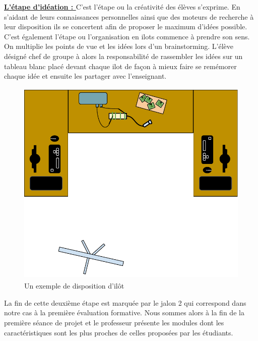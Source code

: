 \documentclass[12pt]{article}
\begin{document}
\vspace{10pt}

\textbf{\underline{L'étape d'idéation : }} C'est l'étape ou la créativité des élèves s'exprime. En s'aidant de leurs connaissances personnelles ainsi que des moteurs de recherche à leur disposition ils se concertent afin de proposer le maximum d'idées possible. C'est également l'étape ou l'organisation en ilots commence à prendre son sens. On multiplie les points de vue et les idées lors d'un brainstorming. L'élève désigné chef de groupe à alors la responsabilité de rassembler les idées sur un tableau blanc placé devant chaque ilot de façon à mieux faire se remémorer chaque idée et ensuite les partager avec l'enseignant.
\newpage
\begin{figure}[!h]
\centering
\includegraphics[width=14cm,height=10cm,trim=0cm 0cm 0cm 0cm, clip=true]{Images_Rapport/ilot}
\caption{Un exemple de disposition d'ilôt}
\end{figure}

\vspace{20pt}

La fin de cette deuxième étape est marquée par le jalon 2 qui correspond dans notre cas à la première évaluation formative. Nous sommes alors à la fin de la première séance de projet et le professeur présente les modules dont les caractéristiques sont les plus proches de celles proposées par les étudiants.\par
\vspace{20pt}
\end{document}
